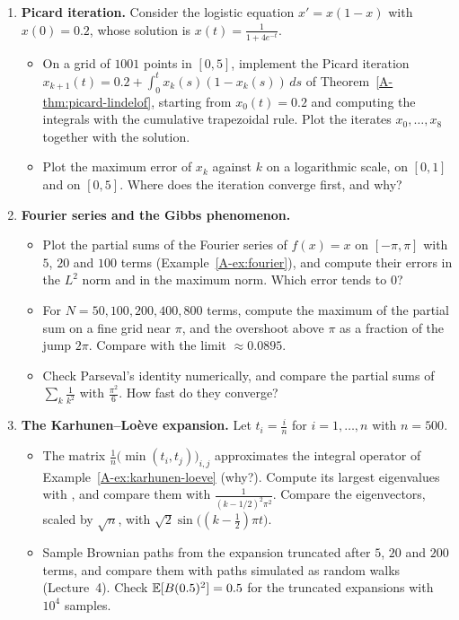 \begin{enumerate}[label=\textbf{P\arabic*.}, leftmargin=*]
    \item \textbf{Picard iteration.} Consider the logistic equation $x' = x(1 - x)$ with $x(0) = 0.2$, whose solution is $x(t) = \frac{1}{1 + 4e^{-t}}$.
    \begin{itemize}
        \item On a grid of $1001$ points in $[0, 5]$, implement the Picard iteration $x_{k+1}(t) = 0.2 + \int_0^t x_k(s)(1 - x_k(s))\, ds$ of Theorem~\ref{A-thm:picard-lindelof}, starting from $x_0(t) = 0.2$ and computing the integrals with the cumulative trapezoidal rule. Plot the iterates $x_0, \ldots, x_8$ together with the solution.
        \item Plot the maximum error of $x_k$ against $k$ on a logarithmic scale, on $[0, 1]$ and on $[0, 5]$. Where does the iteration converge first, and why?
    \end{itemize}

    \item \textbf{Fourier series and the Gibbs phenomenon.}
    \begin{itemize}
        \item Plot the partial sums of the Fourier series of $f(x) = x$ on $[-\pi, \pi]$ with $5$, $20$ and $100$ terms (Example~\ref{A-ex:fourier}), and compute their errors in the $L^2$ norm and in the maximum norm. Which error tends to $0$?
        \item For $N = 50, 100, 200, 400, 800$ terms, compute the maximum of the partial sum on a fine grid near $\pi$, and the overshoot above $\pi$ as a fraction of the jump $2\pi$. Compare with the limit $\approx 0.0895$.
        \item Check Parseval's identity numerically, and compare the partial sums of $\sum_k \frac{1}{k^2}$ with $\frac{\pi^2}{6}$. How fast do they converge?
    \end{itemize}

    \item \textbf{The Karhunen--Lo\`eve expansion.} Let $t_i = \frac{i}{n}$ for $i = 1, \ldots, n$ with $n = 500$.
    \begin{itemize}
        \item The matrix $\frac{1}{n}\big(\min(t_i, t_j)\big)_{i, j}$ approximates the integral operator of Example~\ref{A-ex:karhunen-loeve} (why?). Compute its largest eigenvalues with , and compare them with $\frac{1}{(k - 1/2)^2\pi^2}$. Compare the eigenvectors, scaled by $\sqrt{n}$, with $\sqrt{2}\sin\big((k - \frac{1}{2})\pi t\big)$.
        \item Sample Brownian paths from the expansion truncated after $5$, $20$ and $200$ terms, and compare them with paths simulated as random walks (Lecture~4). Check $\mathbb{E}[B(0.5)^2] = 0.5$ for the truncated expansions with $10^4$ samples.
    \end{itemize}


\end{enumerate}

